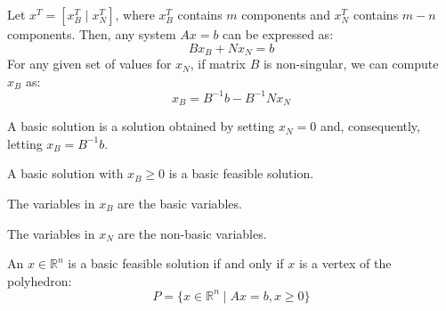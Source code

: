 Let $x^T=\left[x_B^T \mid  x_N^T\right]$, where $x_B^T$ contains  $m$ components and $x_N^T$ contains  $m-n$ components. 
Then, any system $Ax = b$ can be expressed as:
\[Bx_B+Nx_N=b\]
For any given set of values for $x_N$, if matrix  $B$ is non-singular, we can compute $x_B$ as:
\[x_B=B^{-1}b-B^{-1}Nx_N\]
\begin{definition}
    A basic solution is a solution obtained by setting $x_N=0$ and, consequently, letting $x_B=B^{-1}b$.
\end{definition}
\begin{definition}
    A basic solution with $x_B \geq 0$ is a basic feasible solution.
\end{definition}
\begin{definition}
    The variables in $x_B$ are the basic variables.
\end{definition}
\begin{definition}
    The variables in $x_N$ are the non-basic variables.
\end{definition}
\begin{theorem}
    An $x \in \mathbb{R}^n$ is a basic feasible solution if and only if $x$ is a vertex of the polyhedron:
    \[P=\{x \in \mathbb{R}^n\mid Ax=b,x \geq 0\}\]
\end{theorem}
